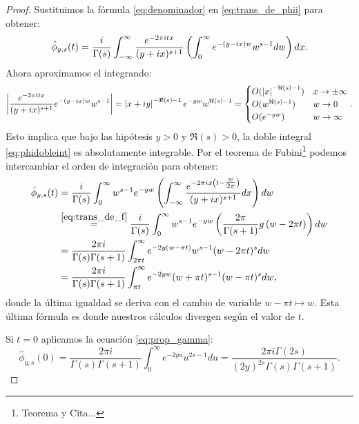 \begin{proof}
Sustituimos la f\'ormula \eqref{eq:denominador} en \eqref{eq:trans_de_phii} para obtener:
\begin{equation}\label{eq:phidobleint}
  \hat{\phi}_{y,s}(t)=
  \frac{i}{\Gamma(s)}\int_{-\infty}^{\infty}\frac{e^{-2\pi itx}}{(y+ix)^{s+1}}
  \left( \int_0^{\infty}e^{-(y-ix)w}w^{s-1}dw \right)dx.
\end{equation}
Ahora aproximamos el integrando:
\[
  \left| \frac{e^{-2\pi itx}}{(y+ix)^{s+1}}e^{-(y-ix)w}w^{s-1} \right|
  =\left| x+iy \right|^{-\Re(s)-1}e^{-yw}w^{\Re(s)-1}=
  \begin{cases}
    O(\left| x \right|^{-\Re(s)-1}) & x\rightarrow\pm\infty\\
    O(w^{\Re(s)-1}) & w\rightarrow 0\\
    O(e^{-yw}) & w\rightarrow\infty
  \end{cases}.
\]
Esto implica que bajo las hip\'otesis $y>0$ y $\Re(s)>0$, la doble integral \eqref{eq:phidobleint}
es absolutamente integrable. Por el teorema de Fubini\footnote{Teorema y Cita...}
podemos intercambiar el orden de integraci\'on para obtener:
\begin{align}
  \hat{\phi}_{y,s}(t)&=
  \frac{i}{\Gamma(s)}\int_{0}^{\infty}w^{s-1}e^{-yw}
  \left( \int_{-\infty}^{\infty}
  \frac{e^{-2\pi ix\left( t-\tfrac{w}{2\pi} \right)}}{(y+ix)^{s+1}}dx \right)dw\nonumber\\
  &\overset{\eqref{eq:trans_de_f}}{=}\frac{i}{\Gamma(s)}\int_{0}^{\infty}w^{s-1}e^{-yw}
    \left( \frac{2\pi}{\Gamma(s+1)}g\left( w-2\pi t \right) \right)dw\nonumber\\
  &=\frac{2\pi i}{\Gamma(s)\Gamma(s+1)}
    \int_{2\pi t}^{\infty}e^{-2y(w-\pi t)}w^{s-1}(w-2\pi t)^sdw\nonumber\\
   &=\frac{2\pi i}{\Gamma(s)\Gamma(s+1)}\int_{\pi t}^{\infty}e^{-2yw}(w+\pi t)^{s-1}(w-\pi t)^sdw,
   \label{eq:phisemifinal}
\end{align}
donde la \'ultima igualdad se deriva con el cambio de variable $w-\pi t\mapsto w$. Esta \'ultima
f\'ormula es donde nuestros c\'alculos divergen seg\'un el valor de $t$.

Si $t=0$ aplicamos la ecuaci\'on \eqref{eq:prop_gamma}:
\[
  \hat{\phi}_{y,s}(0)=\frac{2\pi i}{\Gamma(s)\Gamma(s+1)}\int_0^{\infty}e^{-2yu}u^{2s-1}du=
  \frac{2\pi i\Gamma(2s)}{(2y)^{2s}\Gamma(s)\Gamma(s+1)}.
\]


\end{proof}

